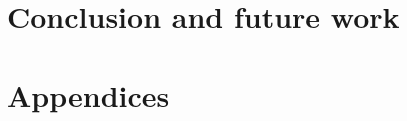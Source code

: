 \documentclass[letterpaper,11pt]{report}
\begin{document}
\chapter{Conclusion and future work}

%

\begin{singlespace}


\end{singlespace}


{}%
%
\chapter*{Appendices}
\renewcommand\thesection{\Alph{section}}
\renewcommand*{\thesubsection}{\Alph{section}.\arabic{subsection}}
\begingroup
{}
%

\endgroup

\end{document}
